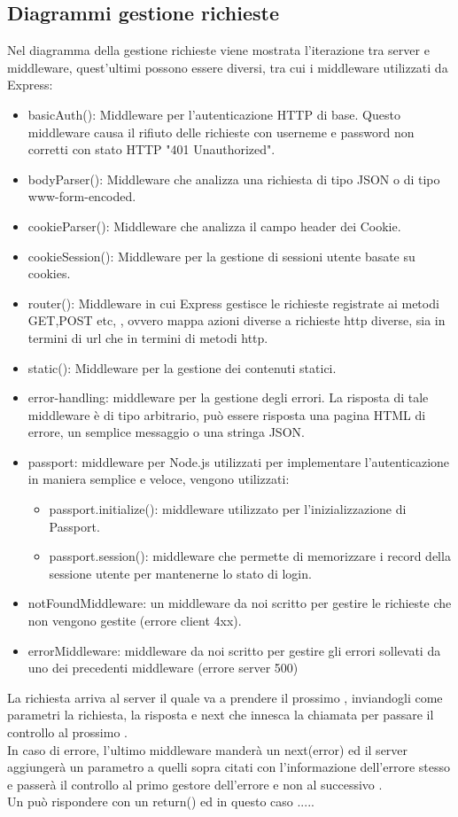 \subsection{Diagrammi gestione richieste}
Nel diagramma della gestione richieste viene mostrata l'iterazione tra server e middleware, quest'ultimi possono essere diversi, tra cui i middleware utilizzati da Express:
\begin{itemize}
\item{basicAuth()}: Middleware per l'autenticazione HTTP di base. Questo middleware causa il rifiuto delle richieste con userneme e password non corretti con stato HTTP "401 Unauthorized".
\item{bodyParser()}: Middleware che analizza una richiesta di tipo JSON o di tipo www-form-encoded.
\item{cookieParser()}: Middleware che analizza il campo header dei Cookie.
\item{cookieSession()}: Middleware per la gestione di sessioni utente basate su cookies.
\item{router()}: Middleware in cui Express gestisce le richieste registrate ai metodi GET,POST etc, , ovvero mappa azioni diverse a richieste http diverse, sia in termini di url che in termini di metodi http.
\item{static()}: Middleware per la gestione dei contenuti statici.
\item{error-handling}: middleware per la gestione degli errori. La risposta di tale middleware è di tipo arbitrario, può essere risposta una pagina HTML di errore, un semplice messaggio o una stringa JSON.
\item{passport}: middleware per Node.js utilizzati per implementare l'autenticazione in maniera semplice e veloce, vengono utilizzati:
	\begin{itemize}
	\item{passport.initialize()}: middleware utilizzato per l'inizializzazione di Passport.
	\item{passport.session()}:  middleware che permette di memorizzare i record della sessione utente per mantenerne lo stato di
	login. 
	\end{itemize}
\item{notFoundMiddleware}: un middleware da noi scritto per gestire le richieste che non vengono gestite (errore client 4xx).
\item{errorMiddleware}: middleware da noi scritto per gestire gli errori sollevati da uno dei precedenti middleware (errore server
500)
\end{itemize}
La richiesta arriva al server il quale va a prendere il prossimo , inviandogli come parametri la richiesta, la risposta e next che innesca la chiamata per passare il controllo al prossimo .  \\
In caso di errore, l'ultimo middleware manderà un next(error) ed il server aggiungerà un parametro a quelli sopra citati con l'informazione dell'errore stesso e passerà il controllo al primo gestore dell'errore e non al successivo . \\
Un  può rispondere con un return() ed in questo caso ..... %

